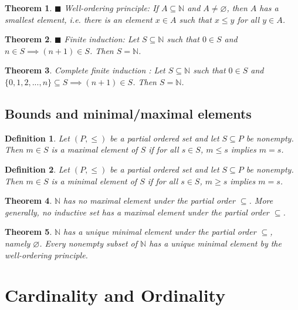 \documentclass[a4paper]{article}
\newtheorem{mytheorem}{Theorem}
\newtheorem{mydef}{Definition}
\numberwithin{mytheorem}{section}
\numberwithin{mydef}{section}
\numberwithin{axiom}{section}
\numberwithin{example}{section}
\newcommand{\done}{$\blacksquare$ }
\begin{document}
\begin{mytheorem} \done Well-ordering principle: If $A \subseteq \mathbb{N}$ and $A \neq \varnothing$, then $A$ has a smallest element, i.e. there is an element $x \in A$ such that $x \leq y$ for all $y \in A$.
\end{mytheorem}

\begin{mytheorem} \done Finite induction: Let $S \subseteq \mathbb{N}$ such that $0 \in S$ and $n \in S \implies (n+1) \in S$. Then $S = \mathbb{N}$.
\end{mytheorem}

\begin{mytheorem} Complete finite induction : Let $S \subseteq \mathbb{N}$ such that $0 \in S$ and $\{0,1,2,...,n\} \subseteq S \implies (n+1) \in S$. Then $S = \mathbb{N}$.
\end{mytheorem}

\subsection{Bounds and minimal/maximal elements}

\begin{mydef} Let $(P, \leq)$ be a partial ordered set and let $S \subseteq P$ be nonempty. Then $m \in S$ is a maximal element of $S$ if for all $s \in S$, $m \leq s$ implies $m = s$. 
\end{mydef}

\begin{mydef} Let $(P, \leq)$ be a partial ordered set and let $S \subseteq P$ be nonempty. Then $m \in S$ is a minimal element of $S$ if for all $s \in S$, $m \geq s$ implies $m = s$. 
\end{mydef}

\begin{mytheorem} $\mathbb{N}$ has no maximal element under the partial order $\subseteq$. More generally, no inductive set has a maximal element under the partial order $\subseteq$.
\end{mytheorem}

\begin{mytheorem} $\mathbb{N}$ has a unique minimal element under the partial order $\subseteq$, namely $\varnothing$. Every nonempty subset of $\mathbb{N}$ has a unique minimal element by the well-ordering principle.
\end{mytheorem}


\section{Cardinality and Ordinality}
\end{document}
